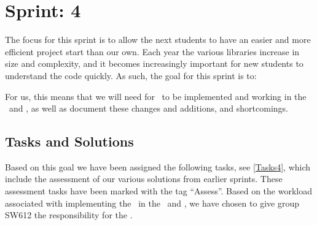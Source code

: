 \chapter{Sprint: 4}

The focus for this sprint is to allow the next students
to have an easier and more efficient project start than our own. Each year the
various libraries increase in size and complexity, and it becomes increasingly
important for new students to understand the code quickly. As such, the goal
for this sprint is to:\nl

\nl

For us, this means that we will need for \rlib\ to be implemented and
working in the \lapp\ and \clib, as well as document these changes and
additions, and shortcomings.

\section{Tasks and Solutions}
Based on this goal we have been assigned the following tasks, see
\autoref{Tasks4}, which include the assessment of our various solutions from
earlier sprints. These assessment tasks have been marked with the tag
``Assess''. Based on the workload associated with implementing the \rlib\ in the
\lapp\ and \clib, we have chosen to give group SW612 the responsibility for the \plib.

